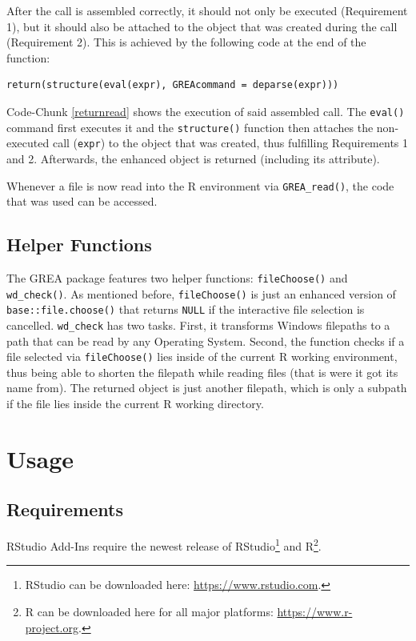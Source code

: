 \documentclass[12pt]{article} %
\newcommand{\li}{\lstinline}
\begin{document}
After the call is assembled correctly, it should not only be executed (Requirement 1), but it should also be attached to the object that was created during the call (Requirement 2). This is achieved by the following code at the end of the function:
\begin{lstlisting}[caption = Return Command of the \li{GREA_read()} function, label = returnread]
return(structure(eval(expr), GREAcommand = deparse(expr)))
\end{lstlisting}

Code-Chunk \ref{returnread} shows the execution of said assembled call. The \li{eval()} command first executes it and the \li{structure()} function then attaches the non-executed call (\li{expr}) to the object that was created, thus fulfilling Requirements 1 and 2. Afterwards, the enhanced object is returned (including its attribute).

Whenever a file is now read into the R environment via \li{GREA_read()}, the code that was used can be accessed.

\subsection{Helper Functions}
The GREA package features two helper functions: \li{fileChoose()} and \li{wd_check()}. As mentioned before, \li{fileChoose()} is just an enhanced version of \li{base::file.choose()} that returns \li{NULL} if the interactive file selection is cancelled. \li{wd_check} has two tasks. First, it transforms Windows filepaths to a path that can be read by any Operating System. Second, the function checks if a file selected via \li{fileChoose()} lies inside of the current R working environment, thus being able to shorten the filepath while reading files (that is were it got its name from). The returned object is just another filepath, which is only a subpath if the file lies inside the current R working directory. 

\section{Usage}

\subsection{Requirements}

RStudio Add-Ins require the newest release of RStudio\footnote{RStudio can be downloaded here: \url{https://www.rstudio.com}.} and R\footnote{R can be downloaded here for all major platforms: \url{https://www.r-project.org}.}.
\end{document}
